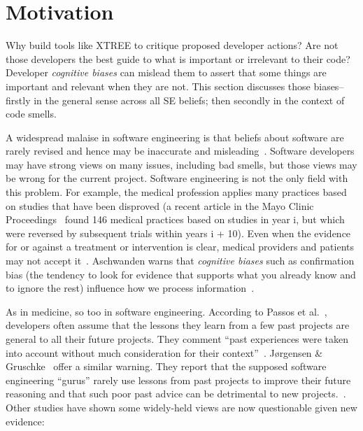 \documentclass{sig-alternate}
\theoremstyle{break}
\begin{document}
 
 
   


\section{Motivation}\label{sect:prelim}

Why build tools like XTREE to  critique proposed developer actions?
Are not those developers the best guide to what is important or irrelevant
to their code? Developer {\em cognitive biases} can mislead them to
assert that some things are important and relevant when they are not.
This section discusses those biases-- firstly in the general sense
across all SE beliefs; then secondly in the   context of code smells.

A widespread malaise in software engineering is that
beliefs about software are rarely revised and hence may be
  inaccurate and 
misleading~\cite{passos11,jorgensen09,mei15,me16phase,prem16}. Software developers may have strong views on many issues, including bad smells, but those views may be wrong for the current
project.
Software engineering is not the only field with this problem.
  For example, the medical profession applies many practices based on studies that have been disproved (a recent article in the Mayo Clinic Proceedings~\cite{prasad13} found 146 medical practices based on studies in year i, but which were reversed by subsequent trials within years i + 10). Even when the evidence for or against a treatment or intervention is clear, medical providers and patients may not accept it~\cite{aschwanden10}. Aschwanden warns that {\em cognitive biases} such as confirmation bias (the tendency to look for evidence that supports what you already know and to ignore the rest) influence how we process information~\cite{aschwanden15}.

As in medicine, so too in software engineering.
According to Passos et al.~\cite{passos11},  developers often  assume that the lessons they learn from a few past projects are general to all their future projects. They comment ``past experiences were taken into account without much consideration for their context''~\cite{passos11}.  J{\o}rgensen \& Gruschke~\cite{jorgensen09} offer a similar warning. They report that the supposed software engineering ``gurus'' rarely use lessons from past projects to improve their future reasoning and that such poor past advice can be detrimental to new projects.~\cite{jorgensen09}. Other studies have shown some widely-held views are   now questionable given new evidence:
\end{document}
